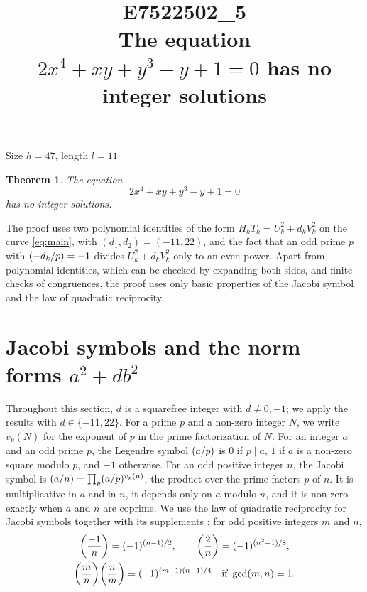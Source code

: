 \documentclass[11pt]{article}
\title{\textbf{E7522502\_5}\\[4pt] {\Large The equation $2x^{4}+xy+y^{3}-y+1=0$ has no integer solutions}}
\author{}
\date{}
\newtheorem{theorem}{Theorem}
\newcommand{\leg}[2]{\mathchoice{\biggl(\dfrac{#1}{#2}\biggr)}{(#1/#2)}{(#1/#2)}{(#1/#2)}}
\begin{document}
\maketitle
\vspace{-8ex}
\begin{center}
Size $h=47$, length $l=11$
\end{center}

\begin{theorem}\label{thm:main}
The equation
\begin{equation}\label{eq:main}
2x^{4}+xy+y^{3}-y+1=0
\end{equation}
has no integer solutions.
\end{theorem}

The proof uses two polynomial identities of the form $H_kT_k=U_k^2+d_kV_k^2$ on the curve \eqref{eq:main}, with $(d_1,d_2)=(-11,22)$, and the fact that an odd prime $p$ with $\leg{-d_k}{p}=-1$ divides $U_k^2+d_kV_k^2$ only to an even power. Apart from polynomial identities, which can be checked by expanding both sides, and finite checks of congruences, the proof uses only basic properties of the Jacobi symbol and the law of quadratic reciprocity.

\section{Jacobi symbols and the norm forms $a^2+db^2$}

Throughout this section, $d$ is a squarefree integer with $d\neq0,-1$; we apply the results with $d\in\{-11,22\}$. For a prime $p$ and a non-zero integer $N$, we write $v_p(N)$ for the exponent of $p$ in the prime factorization of $N$. For an integer $a$ and an odd prime $p$, the Legendre symbol $\leg{a}{p}$ is $0$ if $p\mid a$, $1$ if $a$ is a non-zero square modulo $p$, and $-1$ otherwise. For an odd positive integer $n$, the Jacobi symbol is $\leg{a}{n}=\prod_p\leg{a}{p}^{v_p(n)}$, the product over the prime factors $p$ of $n$. It is multiplicative in $a$ and in $n$, it depends only on $a$ modulo $n$, and it is non-zero exactly when $a$ and $n$ are coprime. We use the law of quadratic reciprocity for Jacobi symbols together with its supplements \cite[Chapter~5, \S2]{IR}: for odd positive integers $m$ and $n$,
\begin{gather*}
\leg{-1}{n}=(-1)^{(n-1)/2},\qquad\leg{2}{n}=(-1)^{(n^2-1)/8},\\
\leg{m}{n}\leg{n}{m}=(-1)^{(m-1)(n-1)/4}\quad\text{if }\gcd(m,n)=1.
\end{gather*}
\end{document}

